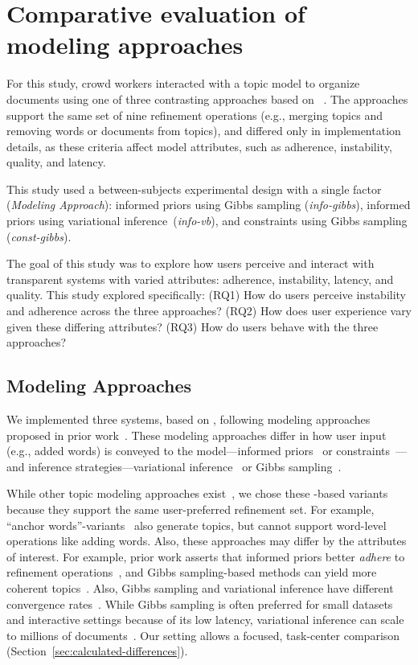 \section{Comparative evaluation of \hltm{} modeling approaches}

For this study, crowd workers interacted with a topic model to organize documents using one of three contrasting
\hltm{} approaches based on \lda~\cite{blei-03}. The approaches support the same set of nine refinement operations (e.g., merging topics and removing words or documents from topics), and differed only in implementation details, as these criteria affect model attributes, such as adherence, instability, quality, and latency.

This study used a between-subjects experimental design with a single factor (\textit{Modeling Approach}): informed priors using Gibbs sampling
(\textit{info-gibbs}), informed priors using variational inference~(\textit{info-vb}), and constraints using Gibbs sampling
(\textit{const-gibbs}). 

The goal of this study was to explore how users perceive and interact with transparent systems with varied attributes: adherence, instability, latency, and quality. This study explored specifically: 
(RQ1) How do users perceive instability and adherence across the three \hltm{} approaches? 
(RQ2) How does user experience vary given these differing attributes? 
(RQ3) How do users behave with the three \hltm{} approaches?

\subsection{Modeling Approaches}

We implemented three \hltm{} systems, based on \lda{}, following modeling approaches
proposed in prior work~\citep{kumar-19}. These modeling
approaches differ in how user input (e.g., added words) is conveyed to the model---informed priors~\cite{Smith2018ClosingSystem} or constraints~\cite{yang-15}---and inference strategies---variational inference~\cite{blei-03} or Gibbs sampling~\cite{griffiths-04}.

While other topic modeling approaches exist~\cite{Larochelle2012AModel,Hofmann1999ProbabilisticIndexing}, we chose these  \lda-based variants because they support the same user-preferred refinement set. For example, ``anchor words''-variants~\cite{Lund2017TandemModeling} also generate topics, but cannot support word-level operations like adding words. Also, these approaches may differ by the attributes of interest. For example, prior work asserts that informed priors better \textit{adhere} to refinement operations~\cite{kumar-19}, and Gibbs sampling-based methods
can yield more coherent topics~\cite{Nguyen2015ImprovingModeling}.
Also, Gibbs sampling and variational inference have different convergence rates~\cite{asuncion-09b}. While Gibbs sampling is often preferred for small datasets and interactive settings because of its low latency, variational inference can scale to millions of documents~\cite{hoffman-10,zhai-12}. 
Our setting allows a focused, task-center comparison (Section~\ref{sec:calculated-differences}).

